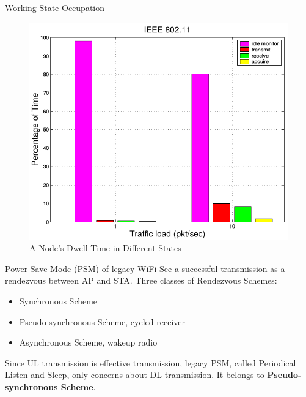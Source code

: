 \documentclass[10pt]{beamer}
\begin{document}
\begin{frame}{Working State Occupation\cite{lin2005comprehensive}}
\begin{figure}
\includegraphics[scale=0.35]{./figure/energy_consumption.png}
\caption{A Node's Dwell Time in Different States}
\label{fig_workoccupation}
\end{figure}
\end{frame}

\begin{frame}{Power Save Mode (PSM) of legacy WiFi}
See a successful transmission as a rendezvous between AP and STA. 
Three classes of Rendezvous Schemes:
\begin{itemize}
\item Synchronous Scheme
\item Pseudo-synchronous Scheme, cycled receiver
\item Asynchronous Scheme, wakeup radio
\end{itemize}
Since UL transmission is effective transmission, legacy PSM, called \alert{Periodical Listen and Sleep}, only concerns about DL transmission. It belongs to \textbf{Pseudo-synchronous Scheme}. 
\end{frame}
\end{document}
